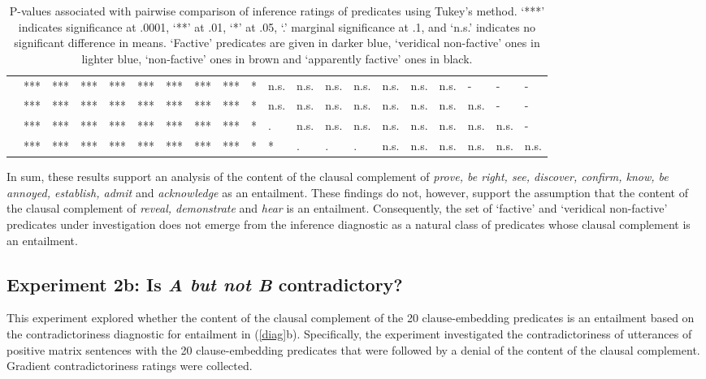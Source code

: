 \documentclass[11pt,fleqn]{article}
\newcommand{\6}{\mbox{$[\hspace*{-.6mm}[$}}
\newcommand{\9}{\mbox{$]\hspace*{-.6mm}]$}}
\begin{document}
\begin{table}[h!]
\begin{tabular}{l l l l l l l l l l l l l l l l l l l l }
\color{blue}{\em discover}\color{black}			& *** & *** & *** & *** & *** & *** & *** & *** & * & n.s. & n.s. & n.s. & n.s. & n.s. & n.s. & n.s. & - & - & - \\
\color{blue}{\em see}\color{black}			& *** & *** & *** & *** & *** & *** & *** & *** & * & n.s. & n.s. & n.s. & n.s. & n.s. & n.s. & n.s. & n.s. & - & - \\
\color{airforceblue}{\em be right}\color{black}			& *** & *** & *** & *** & *** & *** & *** & *** & * & . & n.s. & n.s. & n.s. & n.s. & n.s. & n.s. & n.s. & n.s. & -  \\
\color{black}{\em prove}\color{black}		& *** & *** & *** & *** & *** & *** & *** & *** & *  & *  & . & . & . & n.s. & n.s. & n.s. & n.s. & n.s. & n.s.  \\

\bottomrule
\end{tabular}
\caption{P-values associated with pairwise comparison of inference ratings of predicates using Tukey's method. `***' indicates significance at .0001, `**' at .01, `*' at .05, `.' marginal significance at .1, and `n.s.' indicates no significant difference in means. `Factive' predicates are given in darker blue, `veridical non-factive' ones in lighter blue, `non-factive' ones in brown and `apparently factive' ones in black.}\label{t-pairwise2}
\end{table}

In sum, these results support an analysis of the content of the clausal complement of {\em prove, be right, see, discover, confirm, know, be annoyed, establish, admit} and {\em acknowledge} as an entailment. These findings do not, however, support the assumption that the content of the clausal complement of {\em reveal, demonstrate} and {\em hear} is an entailment. Consequently, the set of `factive' and `veridical non-factive' predicates under investigation does not emerge from the inference diagnostic as a natural class of predicates whose clausal complement is an entailment. 

\subsection{Experiment 2b: Is {\em A but not B} contradictory?}\label{s32}

This experiment explored whether the content of the clausal complement of the 20 clause-embedding predicates is an entailment based on the contradictoriness diagnostic for entailment in (\ref{diag}b). Specifically, the experiment investigated the contradictoriness of utterances of positive matrix sentences with the 20 clause-embedding predicates that were followed by a denial of the content of the clausal complement. Gradient contradictoriness ratings were collected.
\end{document}
